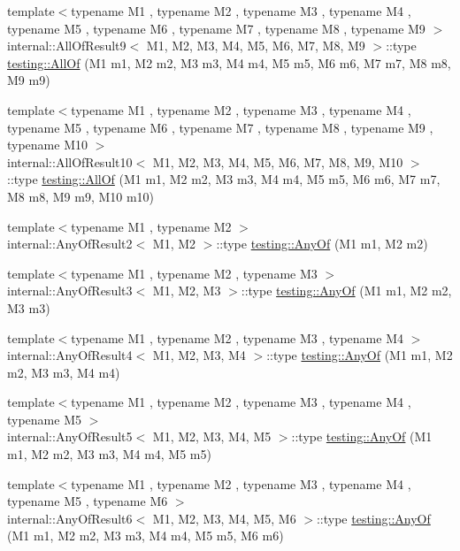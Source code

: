 \begin{DoxyCompactItemize}
\item 
{\footnotesize template$<$typename M1 , typename M2 , typename M3 , typename M4 , typename M5 , typename M6 , typename M7 , typename M8 , typename M9 $>$ }\\internal\+::\+All\+Of\+Result9$<$ M1, M2, M3, M4, M5, M6, M7, M8, M9 $>$\+::type \mbox{\hyperlink{namespacetesting_aaecf2bd8eb7c68b119f9b81a01942b7f}{testing\+::\+All\+Of}} (M1 m1, M2 m2, M3 m3, M4 m4, M5 m5, M6 m6, M7 m7, M8 m8, M9 m9)
\item 
{\footnotesize template$<$typename M1 , typename M2 , typename M3 , typename M4 , typename M5 , typename M6 , typename M7 , typename M8 , typename M9 , typename M10 $>$ }\\internal\+::\+All\+Of\+Result10$<$ M1, M2, M3, M4, M5, M6, M7, M8, M9, M10 $>$\+::type \mbox{\hyperlink{namespacetesting_a9939c08664efeed0c1983090115f7ecb}{testing\+::\+All\+Of}} (M1 m1, M2 m2, M3 m3, M4 m4, M5 m5, M6 m6, M7 m7, M8 m8, M9 m9, M10 m10)
\item 
{\footnotesize template$<$typename M1 , typename M2 $>$ }\\internal\+::\+Any\+Of\+Result2$<$ M1, M2 $>$\+::type \mbox{\hyperlink{namespacetesting_a81cfefd9f75cdce827d5bc873cf73aac}{testing\+::\+Any\+Of}} (M1 m1, M2 m2)
\item 
{\footnotesize template$<$typename M1 , typename M2 , typename M3 $>$ }\\internal\+::\+Any\+Of\+Result3$<$ M1, M2, M3 $>$\+::type \mbox{\hyperlink{namespacetesting_a3ccbde3ba01189587676d44a4333c0a5}{testing\+::\+Any\+Of}} (M1 m1, M2 m2, M3 m3)
\item 
{\footnotesize template$<$typename M1 , typename M2 , typename M3 , typename M4 $>$ }\\internal\+::\+Any\+Of\+Result4$<$ M1, M2, M3, M4 $>$\+::type \mbox{\hyperlink{namespacetesting_a1cfcacf2cf19543b86445e3585d5356f}{testing\+::\+Any\+Of}} (M1 m1, M2 m2, M3 m3, M4 m4)
\item 
{\footnotesize template$<$typename M1 , typename M2 , typename M3 , typename M4 , typename M5 $>$ }\\internal\+::\+Any\+Of\+Result5$<$ M1, M2, M3, M4, M5 $>$\+::type \mbox{\hyperlink{namespacetesting_a049ea436e52c242adc44b2b42dc03e50}{testing\+::\+Any\+Of}} (M1 m1, M2 m2, M3 m3, M4 m4, M5 m5)
\item 
{\footnotesize template$<$typename M1 , typename M2 , typename M3 , typename M4 , typename M5 , typename M6 $>$ }\\internal\+::\+Any\+Of\+Result6$<$ M1, M2, M3, M4, M5, M6 $>$\+::type \mbox{\hyperlink{namespacetesting_a747189264a49a426004366371f1a2575}{testing\+::\+Any\+Of}} (M1 m1, M2 m2, M3 m3, M4 m4, M5 m5, M6 m6)

\end{DoxyCompactItemize}
